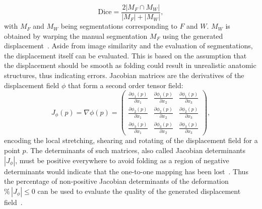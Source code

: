 \begin{equation}
	\text{Dice} = \frac{2 |M_F \cap M_W|}{|M_F| + |M_W|},
\end{equation}
with $M_F$ and $M_W$ being segmentations corresponding to $F$ and $W$. $M_W$ is obtained by warping the manual segmentation $M_F$ using the generated displacement~\cite{NiftiReg}. Aside from image similarity and the evaluation of segmentations, the displacement itself can be evaluated. This is based on the assumption that the displacement should be smooth as folding could result in unrealistic anatomic structures, thus indicating errors. Jacobian matrices are the derivatives of the displacement field $\phi$ that form a second order tensor field:
\begin{equation}
	J_{\phi}(p) = \nabla \mathbb{\phi} (p) = \begin{pmatrix}
	\frac{\partial \phi_1(p)}{\partial x_1} & \frac{\partial \phi_1(p)}{\partial x_2} & \frac{\partial \phi_1(p)}{\partial x_3} \\
	\frac{\partial \phi_2(p)}{\partial x_1} & \frac{\partial \phi_2(p)}{\partial x_2} & \frac{\partial \phi_2(p)}{\partial x_3} \\
	\frac{\partial \phi_3(p)}{\partial x_1} & \frac{\partial \phi_3(p)}{\partial x_2} & \frac{\partial \phi_3(p)}{\partial x_3} 
	\end{pmatrix},
\end{equation}
encoding the local stretching, shearing and rotating of the displacement field for a point $p$. The determinants of such matrices, also called Jacobian determinants $|J_{\phi}|$, must be positive everywhere to avoid folding as a region of negative determinants would indicate that the one-to-one mapping has been lost~\cite{DARTEL}. Thus the percentage of non-positive Jacobian determinants of the deformation $\% \, |J_{\phi}|\leq0$ can be used to evaluate the quality of the generated displacement field~\cite{Chen2023}.
